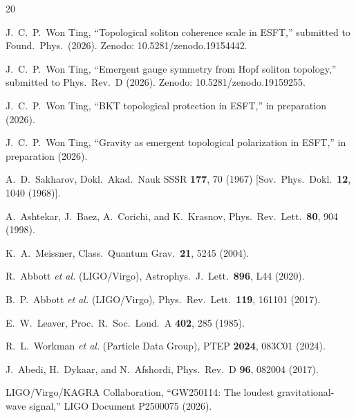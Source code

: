 ﻿\documentclass[twocolumn,preprintnumbers,amsmath,amssymb,prd]{revtex4-2}
\begin{document}
\begin{thebibliography}{20}

 J.~C.~P.~Won Ting, ``Topological soliton coherence scale in ESFT,'' submitted to Found.\ Phys.\ (2026). Zenodo: 10.5281/zenodo.19154442.

 J.~C.~P.~Won Ting, ``Emergent gauge symmetry from Hopf soliton topology,'' submitted to Phys.\ Rev.\ D (2026). Zenodo: 10.5281/zenodo.19159255.

 J.~C.~P.~Won Ting, ``BKT topological protection in ESFT,'' in preparation (2026).

 J.~C.~P.~Won Ting, ``Gravity as emergent topological polarization in ESFT,'' in preparation (2026).

 A.~D.~Sakharov, Dokl.\ Akad.\ Nauk SSSR \textbf{177}, 70 (1967) [Sov.\ Phys.\ Dokl.\ \textbf{12}, 1040 (1968)].

 A.~Ashtekar, J.~Baez, A.~Corichi, and K.~Krasnov, Phys.\ Rev.\ Lett.\ \textbf{80}, 904 (1998).

 K.~A.~Meissner, Class.\ Quantum Grav.\ \textbf{21}, 5245 (2004).

 R.~Abbott \textit{et al.} (LIGO/Virgo), Astrophys.\ J.\ Lett.\ \textbf{896}, L44 (2020).

 B.~P.~Abbott \textit{et al.} (LIGO/Virgo), Phys.\ Rev.\ Lett.\ \textbf{119}, 161101 (2017).

 E.~W.~Leaver, Proc.\ R.\ Soc.\ Lond.\ A \textbf{402}, 285 (1985).

 R.~L.~Workman \textit{et al.} (Particle Data Group), PTEP \textbf{2024}, 083C01 (2024).

 J.~Abedi, H.~Dykaar, and N.~Afshordi, Phys.\ Rev.\ D \textbf{96}, 082004 (2017).

 LIGO/Virgo/KAGRA Collaboration, ``GW250114: The loudest gravitational-wave signal,'' LIGO Document P2500075 (2026).

\end{thebibliography}
\end{document}
